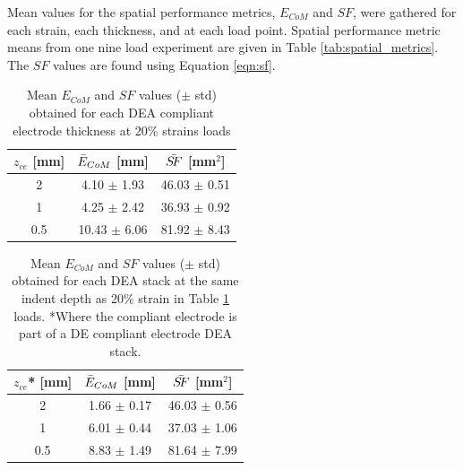 Mean values for the spatial performance metrics, $E_{CoM}$ and $S\!F$, were gathered for each strain, each thickness, and at each load point. Spatial performance metric means from one nine load experiment are given in Table \ref{tab:spatial_metrics}. The $S\!F$ values are found using Equation \ref{eqn:sf}.

\begin{table}[H]
	\centering
	\caption{Mean $E_{CoM}$ and $S\!F$ values ($\pm$ std) obtained for each DEA compliant electrode thickness at 20\% strains loads}
	\label{tab:spatial_metrics_ce}
	\begin{tabular}{c|c|c}
		$z_{ce}$ [mm] & $\Bar{E}_{CoM}$ [mm] & $\Bar{S\!F}$ [mm$^2$] \\
		\hline
		2 & 4.10 $\pm$ 1.93 & 46.03 $\pm$ 0.51\\ %
		1 & 4.25 $\pm$ 2.42 & 36.93 $\pm$ 0.92\\
		0.5 & 10.43 $\pm$ 6.06 & 81.92 $\pm$ 8.43\\
	\end{tabular}
\end{table}

\begin{table}[H]
	\centering
	\caption{Mean $E_{CoM}$ and $S\!F$ values ($\pm$ std) obtained for each DEA stack at the same indent depth as 20\% strain in Table \ref{tab:spatial_metrics_ce} loads. *Where the compliant electrode is part of a DE compliant electrode DEA stack.}
	\label{tab:spatial_metrics_dea}
	\begin{tabular}{c|c|c}
		$z_{ce}$* [mm] & $\Bar{E}_{CoM}$ [mm] & $\Bar{S\!F}$ [mm$^2$] \\
		\hline
		2 & 1.66 $\pm$ 0.17 & 46.03 $\pm$ 0.56\\ %
		1 & 6.01 $\pm$ 0.44 & 37.03 $\pm$ 1.06\\ 
		0.5 & 8.83 $\pm$ 1.49 & 81.64 $\pm$ 7.99\\ %
	\end{tabular}
\end{table}

